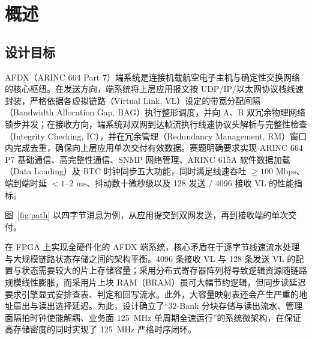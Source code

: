 \chapter{概述}\label{ch:intro}

\section{设计目标}

AFDX（ARINC 664 Part 7）端系统是连接机载航空电子主机与确定性交换网络的核心枢纽。在发送方向，端系统将上层应用报文按 UDP/IP/以太网协议栈线速封装，严格依据各虚拟链路（Virtual Link, VL）设定的带宽分配间隔（Bandwidth Allocation Gap, BAG）执行整形调度，并向 A、B 双冗余物理网络锁步并发；在接收方向，端系统对双网到达帧流执行线速协议头解析与完整性检查（Integrity Checking, IC），并在冗余管理（Redundancy Management, RM）窗口内完成去重，确保向上层应用单次交付有效数据。赛题明确要求实现 ARINC 664 P7 基础通信、高完整性通信、SNMP 网络管理、ARINC 615A 软件数据加载（Data Loading）及 RTC 时钟同步五大功能，同时满足线速吞吐 $\ge 100\text{ Mbps}$、端到端时延 $<1\text{--}2\text{ ms}$、抖动数十微秒级以及 128 发送 / 4096 接收 VL 的性能指标。

图~\ref{fig:path} 以四字节消息为例，从应用提交到双网发送，再到接收端的单次交付。


在 FPGA 上实现全硬件化的 AFDX 端系统，核心矛盾在于逐字节线速流水处理与大规模链路状态存储之间的架构平衡。4096 条接收 VL 与 128 条发送 VL 的配置与状态需要较大的片上存储容量；采用分布式寄存器阵列将导致逻辑资源随链路规模线性膨胀，而采用片上块 RAM（BRAM）虽可大幅节约逻辑，但同步读延迟要求引擎显式安排查表、判定和回写流水。此外，大容量映射表还会产生严重的地址扇出与读出选择延迟。为此，设计确立了“32-Bank 分块存储与读出流水、管理面隔拍时钟使能解耦、业务面 125~MHz 单周期全速运行”的系统微架构，在保证高存储密度的同时实现了 125~MHz 严格时序闭环。

